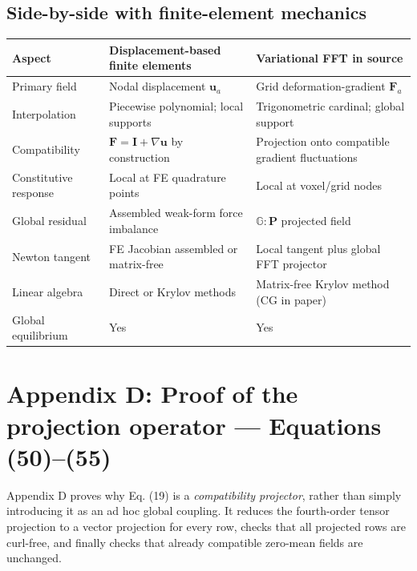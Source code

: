 \documentclass[11pt,a4paper]{article}
\numberwithin{equation}{section}
\newcommand{\F}{\mathbf F}
\newcommand{\Pstress}{\mathbf P}
\newcommand{\Gop}{\mathbb G}
\newcommand{\uve}{\mathbf u}
\begin{document}
\subsection{Side-by-side with finite-element mechanics}
\begin{center}\small
\begin{tabularx}{\textwidth}{@{}lXX@{}}\toprule
Aspect & Displacement-based finite elements & Variational FFT in source\\\midrule
Primary field & Nodal displacement $\uve_a$ & Grid deformation-gradient $\F_a$\\
Interpolation & Piecewise polynomial; local supports & Trigonometric cardinal; global support\\
Compatibility & $\F=\mathbf I+\nabla\uve$ by construction & Projection onto compatible gradient fluctuations\\
Constitutive response & Local at FE quadrature points & Local at voxel/grid nodes\\
Global residual & Assembled weak-form force imbalance & $\Gop:\Pstress$ projected field\\
Newton tangent & FE Jacobian assembled or matrix-free & Local tangent plus global FFT projector\\
Linear algebra & Direct or Krylov methods & Matrix-free Krylov method (CG in paper)\\
Global equilibrium & Yes & Yes\\\bottomrule
\end{tabularx}
\end{center}

\section{Appendix D: Proof of the projection operator --- Equations (50)--(55)}
Appendix D proves why Eq. (19) is a \emph{compatibility projector}, rather than simply introducing it as an ad hoc global coupling. It reduces the fourth-order tensor projection to a vector projection for every row, checks that all projected rows are curl-free, and finally checks that already compatible zero-mean fields are unchanged.
\end{document}

